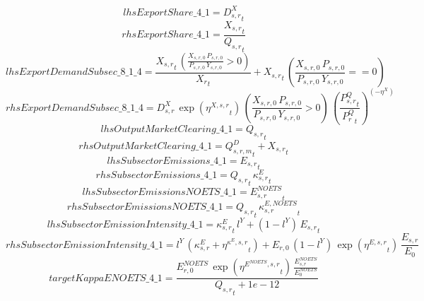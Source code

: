 \begin{dmath*}
lhsExportShare\_4\_1 = {{D^{X}_{s,r}}}_{t}
\end{dmath*}
\begin{dmath*}
rhsExportShare\_4\_1 = \frac{{{X_{s,r}}}_{t}}{{{Q_{s,r}}}_{t}}
\end{dmath*}
\begin{dmath*}
lhsExportDemandSubsec\_8\_1\_4 = \frac{{{X_{s,r}}}_{t}\, \left({\frac{X_{s,r,0} \, P_{s,r,0}}{P_{s,r,0} \, Y_{s,r,0}}}>0\right)}{{{X_r}}_{t}}+{{X_{s,r}}}_{t}\, \left({\frac{X_{s,r,0} \, P_{s,r,0}}{P_{s,r,0} \, Y_{s,r,0}}}==0\right)
\end{dmath*}
\begin{dmath*}
rhsExportDemandSubsec\_8\_1\_4 = {{D^{X}_{s,r}}}\, \exp\left({{\eta^{X,s,r}}}_{t}\right)\, \left({\frac{X_{s,r,0} \, P_{s,r,0}}{P_{s,r,0} \, Y_{s,r,0}}}>0\right)\, \left(\frac{{{P^Q_{s,r}}}_{t}}{{{P^Q_{r}}}_{t}}\right)^{\left(-{{\eta^{X}}}\right)}
\end{dmath*}
\begin{dmath*}
lhsOutputMarketClearing\_4\_1 = {{Q_{s,r}}}_{t}
\end{dmath*}
\begin{dmath*}
rhsOutputMarketClearing\_4\_1 = {{Q^D_{s,r,m}}}_{t}+{{X_{s,r}}}_{t}
\end{dmath*}
\begin{dmath*}
lhsSubsectorEmissions\_4\_1 = {{E_{s,r}}}_{t}
\end{dmath*}
\begin{dmath*}
rhsSubsectorEmissions\_4\_1 = {{Q_{s,r}}}_{t}\, {{\kappa^{E}_{s,r}}}_{t}
\end{dmath*}
\begin{dmath*}
lhsSubsectorEmissionsNOETS\_4\_1 = {{E^{NOETS}_{s,r}}}_{t}
\end{dmath*}
\begin{dmath*}
rhsSubsectorEmissionsNOETS\_4\_1 = {{Q_{s,r}}}_{t}\, {{\kappa^{E,NOETS}_{s,r}}}_{t}
\end{dmath*}
\begin{dmath*}
lhsSubsectorEmissionIntensity\_4\_1 = {{\kappa^{E}_{s,r}}}_{t}\, {{l^{Y}}}+\left(1-{{l^{Y}}}\right)\, {{E_{s,r}}}_{t}
\end{dmath*}
\begin{dmath*}
rhsSubsectorEmissionIntensity\_4\_1 = {{l^{Y}}}\, \left({{\kappa^{E}_{s,r}}}+{{\eta^{\kappa^{E},s,r}}}_{t}\right)+{{E_{r,0}}}\, \left(1-{{l^{Y}}}\right)\, \exp\left({{\eta^{E,s,r}}}_{t}\right)\, {{\frac{E_{s,r}}{E_0}}}
\end{dmath*}
\begin{dmath*}
targetKappaENOETS\_4\_1 = \frac{{{E^{NOETS}_{r,0}}}\, \exp\left({{\eta^{E^{NOETS},s,r}}}_{t}\right)\, {{\frac{E^{NOETS}_{s,r}}{E^{NOETS}_0}}}}{{{Q_{s,r}}}_{t}+1e-12}
\end{dmath*}
